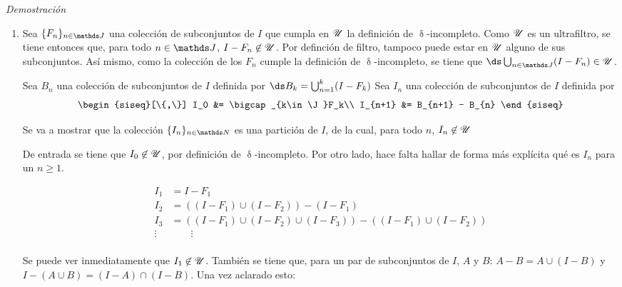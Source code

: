 \documentclass{article}
\theoremstyle{definition}
\theoremstyle{theorem*}
\begin{document}
\begin{proofbox}{\textit{Demostración}}
  \begin{enumerate}
    \item Sea $\{F_n\}_{n \in \J}$ una colección de subconjuntos de $I$ que
          cumpla en $\mathscr{U}$ la definición de $\updelta$-incompleto. Como $\mathscr{U}$
          es un ultrafiltro, se tiene entonces que, para todo $n \in \J$,
          $I - F_n \not\in \mathscr{U}$. Por definción de filtro, tampoco
          puede estar en $\mathscr{U}$ alguno de sus subconjuntos. Así mismo,
          como la colección de los $F_n$ cumple la definición de
          $\updelta$-incompleto, se tiene que $\ds\bigcup_{n\in\J}(I-F_n) \in \U$.

          Sea $B_n$ una colección de subconjuntos de $I$ definida por
          $\ds B_k = \bigcup_{n=1}^{k}(I-F_k)$
          Sea $I_n$ una colección de subconjuntos de $I$ definida por
          \[
            \begin{siseq}[\{,\}]
              I_0     &= \bigcap_{k\in\J}F_k\\
              I_{n+1} &= B_{n+1} - B_{n}
            \end{siseq}
          \]

          Se va a mostrar que la colección $\{I_n\}_{n\in\N}$ es una partición de $I$,
          de la cual, para todo $n$, $I_n \not\in \mathscr{U}$

          De entrada se tiene que $I_0 \not\in \mathscr{U}$, por definición de $\updelta$-incompleto.
          Por otro lado, hace falta hallar de forma más explícita qué es $I_n$ para un $n\geq1$.
          
          \begin{align*}
            I_1     &= I - F_1\\
            I_2     &= ((I - F_1) \cup (I-F_2)) - (I-F_1)\\
            I_3     &= ((I-F_1) \cup (I-F_2) \cup (I-F_3)) - ((I - F_1) \cup (I-F_2))\\
            \vdots  & \qquad\vdots\\
          \end{align*}

          Se puede ver inmediatamente que $I_1 \not\in \mathscr{U}$. También se tiene que, para
          un par de subconjuntos de $I$, $A$ y $B$: $A - B = A \cup (I - B)$ y
          $I-(A\cup B) = (I-A)\cap(I-B)$. Una vez aclarado esto:


\end{enumerate}
\end{proofbox}
\end{document}

